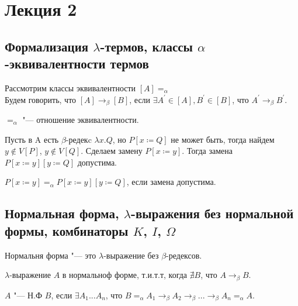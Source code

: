 \section{Лекция 2}

\subsection{Формализация $\lambda$-термов, классы $\alpha$-эквивалентности термов}

\begin{definition}
	Рассмотрим классы эквивалентности $[A]=_{\alpha}$ \\
	Будем говорить, что $[A]\to_{\beta}[B]$, если $\exists A^{'}\in [A], B^{'} \in [B]$, что $A^{'}\to_{\beta}B^{'}$.
\end{definition}

\begin{lemma}
	$=_{\alpha}$ "--- отношение эквивалентности.
\end{lemma}

Пусть в A есть $\beta$-редекc $\lambda{}x.Q$, но $P[x\coloneqq{}Q]$ не может быть,
тогда найдем $y\notin V[P]$, $y\notin V[Q]$. Сделаем замену $P[x\coloneqq{}y]$.
Тогда замена $P[x\coloneqq{}y][y\coloneqq{}Q]$ допустима.

\begin{lemma}
	$P[x\coloneqq{}y]=_{\alpha}P[x\coloneqq{}y][y\coloneqq{}Q]$, если замена допустима.
\end{lemma}

\subsection{Нормальная форма, $\lambda$-выражения без нормальной формы, комбинаторы $K$, $I$, $\Omega$}

\begin{definition}
	Нормальня форма "--- это $\lambda$-выражение без $\beta$-редексов.
\end{definition}

\begin{lemma}
	$\lambda$-выражение $A$ в нормальноф форме, т.и.т.т, когда $\nexists{}B$, что $A\to_{\beta}B$.
\end{lemma}

\begin{definition}
	$A$ "--- Н.Ф $B$, если $\exists A_{1}...A_{n}$, что $B=_{\alpha}A_{1}\to_{\beta}A_{2}\to_{\beta}...\to_{\beta}A_{n}=_{\alpha}A$.
\end{definition}

